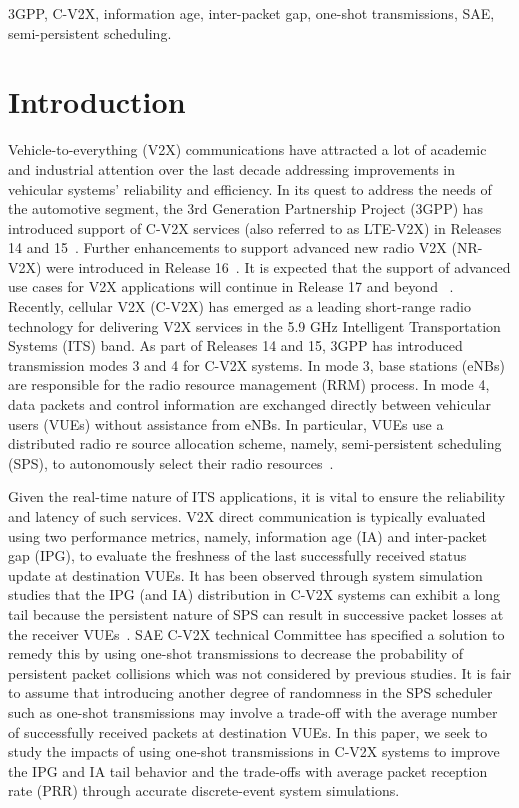 \documentclass[conference]{IEEEtran}
\begin{document}
\begin{IEEEkeywords}
3GPP, C-V2X, information age, inter-packet gap, one-shot transmissions, SAE, semi-persistent scheduling.
\end{IEEEkeywords}
\IEEEpeerreviewmaketitle

\section{Introduction}\label{sec_intro}
Vehicle-to-everything (V2X) communications have attracted a lot of academic and industrial attention over the last decade addressing improvements in vehicular systems’ reliability and efficiency. In its quest to address the needs of the automotive segment, the 3rd Generation Partnership Project (3GPP) has introduced support of C-V2X services (also referred to as LTE-V2X) in Releases 14 and 15~\cite{3gpp37885}. Further enhancements to support advanced new radio V2X (NR-V2X) were introduced in Release 16~\cite{nrpos}. It is expected that the support of advanced use cases for V2X applications will continue in Release 17 and beyond ~\cite{5gaa_slr}. Recently, cellular V2X (C-V2X) has emerged as a leading short-range radio technology for delivering V2X services in the 5.9 GHz Intelligent Transportation Systems (ITS) band. As part of Releases 14 and 15, 3GPP has introduced transmission modes 3 and 4 for C-V2X systems. In mode 3, base stations (eNBs) are responsible for the radio resource management (RRM) process. In mode 4, data packets and control information are exchanged directly between vehicular users (VUEs) without assistance from eNBs. In particular, VUEs use a distributed radio re source allocation scheme, namely, semi-persistent scheduling (SPS), to autonomously select their radio resources~\cite{3gpp36213}.


Given the real-time nature of ITS applications, it is vital to ensure the reliability and latency of such services. V2X direct communication is typically evaluated using two performance metrics, namely, information age (IA) and inter-packet gap (IPG), to evaluate the freshness of the last successfully received status update at destination VUEs. It has been observed through system simulation studies that the IPG (and IA) distribution in C-V2X systems can exhibit a long tail because the persistent nature of SPS can result in successive packet losses at the receiver VUEs~\cite{toyota,bspots}. SAE C-V2X technical Committee has specified a solution to remedy this by using one-shot transmissions to decrease the probability of persistent packet collisions which was not considered by previous studies. It is fair to assume that introducing another degree of randomness in the SPS scheduler such as one-shot transmissions may involve a trade-off with the average number of successfully received packets at destination VUEs. In this paper, we seek to study the impacts of using one-shot transmissions in C-V2X systems to improve the IPG and IA tail behavior and the trade-offs with average packet reception rate (PRR) through accurate discrete-event system simulations. 
\end{document}
